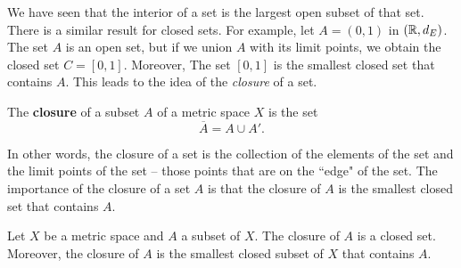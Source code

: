 \begin{comment}

\ActivitySolution

\ba
\item We need to show that $X \setminus C$ is open. 

\item To proceed by contradiction, we assume that $X \setminus C$ is not open.  

\item  Then there exists $x \in X \setminus C$ such that no neighborhood of $x$ is entirely contained in $X \setminus C$. 

\item This implies that every neighborhood of $x$ contains a point in $C$ and so $x$ is a limit point of $C$. It follows that $x \in C$, contradicting the fact that $x \in X \setminus C$. We conclude that $X \setminus C$ is open and $C$ is closed.

\ea

\end{comment}


We have seen that the interior of a set is the largest open subset of that set. There is a similar result for closed sets. For example, let $A = (0,1)$ in $(\mathbb{R}, d_E)$. The set $A$ is an open set, but if we union $A$ with its limit points, we obtain the closed set $C = [0,1]$. Moreover, The set $[0,1]$ is the smallest closed set that contains $A$. This leads to the idea of the \emph{closure} of a set. 

\begin{definition} The \textbf{closure} of a subset $A$ of a metric space $X$ is the set 
\[\overline{A} = A \cup A'.\]
\end{definition}

In other words, the closure of a set is the collection of the elements of the set and the limit points of the set -- those points that are on the ``edge" of the set. The importance of the closure of a set $A$ is that the closure of $A$ is the smallest closed set that contains $A$. 

\begin{theorem} \label{thm:closure_closed} Let $X$ be a metric space and $A$ a subset of $X$. The closure of $A$ is a closed set. Moreover, the closure of $A$ is the smallest closed subset of $X$ that contains $A$. 
\end{theorem}

